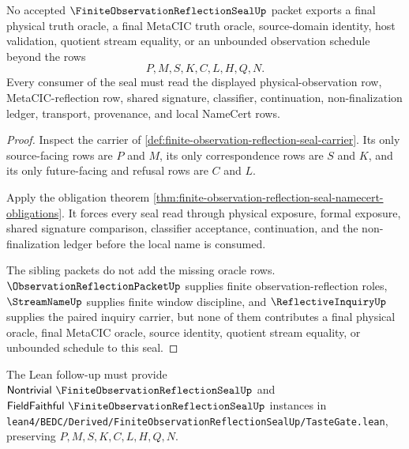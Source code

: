 \begin{theorem}
\label{thm:finite-observation-reflection-seal-nonescape}
No accepted $\FiniteObservationReflectionSealUp$ packet exports a final physical truth oracle, a final MetaCIC truth oracle, source-domain identity, host validation, quotient stream equality, or an unbounded observation schedule beyond the rows
$$
P,M,S,K,C,L,H,Q,N.
$$
Every consumer of the seal must read the displayed physical-observation row, MetaCIC-reflection row, shared signature, classifier, continuation, non-finalization ledger, transport, provenance, and local NameCert rows.
\end{theorem}
\begin{proof}
Inspect the carrier of \autoref{def:finite-observation-reflection-seal-carrier}. Its only source-facing rows are $P$ and $M$, its only correspondence rows are $S$ and $K$, and its only future-facing and refusal rows are $C$ and $L$.

Apply the obligation theorem \autoref{thm:finite-observation-reflection-seal-namecert-obligations}. It forces every seal read through physical exposure, formal exposure, shared signature comparison, classifier acceptance, continuation, and the non-finalization ledger before the local name is consumed.

The sibling packets do not add the missing oracle rows. $\ObservationReflectionPacketUp$ supplies finite observation-reflection roles, $\StreamNameUp$ supplies finite window discipline, and $\ReflectiveInquiryUp$ supplies the paired inquiry carrier, but none of them contributes a final physical oracle, final MetaCIC oracle, source identity, quotient stream equality, or unbounded schedule to this seal.
\end{proof}



The Lean follow-up must provide $\mathsf{Nontrivial}\ \FiniteObservationReflectionSealUp$ and $\mathsf{FieldFaithful}\ \FiniteObservationReflectionSealUp$ instances in \texttt{lean4/BEDC/Derived/FiniteObservationReflectionSealUp/TasteGate.lean}, preserving $P,M,S,K,C,L,H,Q,N$.

